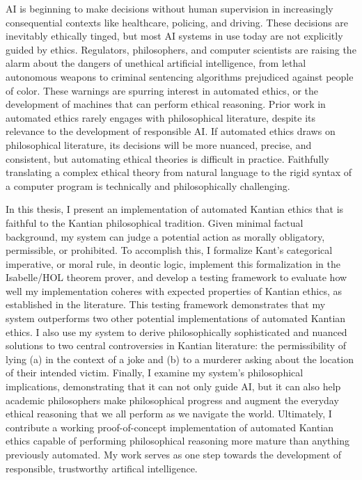 %
\begin{isabellebody}%
%
%
\isadelimtheory
%
\endisadelimtheory
%
\isatagtheory
%
\endisatagtheory
{\isafoldtheory}%
%
\isadelimtheory
%
\endisadelimtheory
%
\begin{isamarkuptext}%
AI is beginning to make decisions without human supervision in increasingly consequential 
contexts like healthcare, policing, and driving. These decisions are inevitably ethically tinged, 
but most AI systems in use today are not explicitly guided by ethics.
Regulators, philosophers, and computer scientists are raising the alarm about the 
dangers of unethical artificial intelligence, from lethal autonomous weapons to criminal
sentencing algorithms prejudiced against people of color. These warnings are spurring interest in 
automated ethics, or the development of machines that can perform ethical reasoning. Prior work in 
automated ethics rarely engages with philosophical literature, despite its relevance to the 
development of responsible AI. If automated ethics draws on philosophical
literature, its decisions will be more nuanced, precise, and consistent, but automating ethical theories is 
difficult in practice. Faithfully translating a complex ethical theory from natural language to the 
rigid syntax of a computer program is technically and philosophically challenging.

In this thesis, I present an implementation of automated Kantian
ethics that is faithful to the Kantian philosophical tradition. Given minimal factual background, my 
system can judge a potential action as morally obligatory, permissible, or prohibited.
To accomplish this, I formalize Kant's categorical imperative, or moral rule,
in deontic logic, implement this formalization 
in the Isabelle/HOL theorem prover, and develop a testing framework to evaluate how well 
my implementation coheres with expected properties of Kantian ethics, as established in the literature. 
This testing framework demonstrates that my system outperforms two other potential implementations of 
automated Kantian ethics. I also use my system to derive philosophically sophisticated and nuanced 
solutions to two central controversies in Kantian literature: the permissibility of lying (a) in the 
context of a joke and (b) to a murderer asking about the location of their intended victim. Finally, I 
examine my system's philosophical implications, demonstrating that it can not only guide AI, but it can
also help academic philosophers make philosophical progress and augment the everyday ethical reasoning
that we all perform as we navigate the world. Ultimately, I contribute a working proof-of-concept implementation
of automated Kantian ethics capable of performing philosophical reasoning more mature than anything previously
automated. My work serves as one step towards the development of responsible, trustworthy artifical intelligence.%
\end{isamarkuptext}\isamarkuptrue%
%
\isadelimtheory
%
\endisadelimtheory
%
\isatagtheory
%
\endisatagtheory
{\isafoldtheory}%
%
\isadelimtheory
%
\endisadelimtheory
%
\end{isabellebody}%
